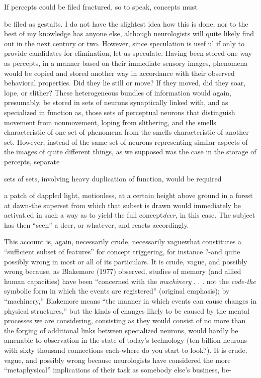 If percepts could be filed fractured, so to speak, concepts must

be filed as gestalts. I do not have the slightest idea how this is done, nor to the best of my knowledge has anyone else, although neurologists will quite likely find out in the next century or two. However, since speculation is usef ul if only to provide candidates for elimination, let us speculate. Having been stored one way as percepts, in a manner based on their immediate sensory images, phenomena would be copied and stored another way in accordance with their observed behavioral properties. Did they lie still or move? If they moved, did they soar, lope, or slither? These heterogeneous bundles of information would again, presumably, be stored in sets of neurons synaptically linked with, and as specialized in function as, those sets of perceptual neurons that distinguish movement from nonmovement, loping from slithering, and the smells characteristic of one set of phenomena from the smells characteristic of another set. However, instead of the same set of neurons representing similar aspects of the images of quite different things, as we supposed was the case in the storage of percepts, separate

sets of sets, involving heavy duplication of function, would be required


a patch of dappled light, motionless, at a certain height above ground in a forest at dawn{}-the superset from which that subset is drawn would immediately be activat.ed in such a way as to yield the full concept\-\textit{deer,} in this case. The subject has then ``seen'' a deer, or whatever, and reacts accordingly.

This account is, again, necessarily crude, necessarily vague\-what constitutes a ``sufficient subset of features'' for concept trig\-gering, for instance ?-and quite possibly wrong in most or all of its particulars. It is crude, vague, and possibly wrong because, as Blake\-more (1977) observed, studies of memory (and allied human capacities) have been ``concerned with the \textit{machinery} . . . not the \textit{code-the }sym\-bolic form in which the events are registered'' (original emphasis); by ``machinery,'' Blakemore means ``the manner in which events can cause changes in physical structures,'' but the kinds of changes likely to be caused by the mental processes we are considering, consisting as they would consist of no more than the forging of additional links between specialized neurons, would hardly be amenable to observation in the state of today's technology (ten billion neurons with sixty thousand connections each-where do you start to look?). It is crude, vague, and possibly wrong because neurologists have considered the more ``meta\-physical'' implications of their task as somebody else's business, be-

